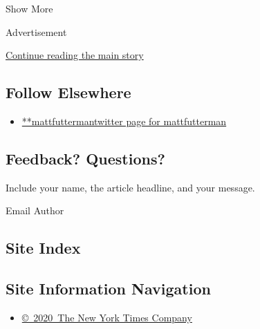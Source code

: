 Show More

Advertisement

\protect\hyperlink{after-mid2}{Continue reading the main story}

\hypertarget{follow-elsewhere}{%
\subsection{Follow Elsewhere}\label{follow-elsewhere}}

\begin{itemize}
\tightlist
\item
  \href{https://twitter.com/mattfutterman}{**mattfuttermantwitter page
  for mattfutterman}
\end{itemize}

\hypertarget{feedback-questions}{%
\subsection{Feedback? Questions?}\label{feedback-questions}}

Include your name, the article headline, and your message.

Email Author

\hypertarget{site-index}{%
\subsection{Site Index}\label{site-index}}

\hypertarget{site-information-navigation}{%
\subsection{Site Information
Navigation}\label{site-information-navigation}}

\begin{itemize}
\tightlist
\item
  \href{https://help.nytimes3xbfgragh.onion/hc/en-us/articles/115014792127-Copyright-notice}{©~2020~The
  New York Times Company}
\end{itemize}

